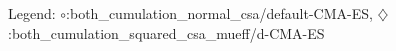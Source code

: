 Legend: {\color{CornflowerBlue}$\circ$}:both\_cumulation\_normal\_csa/default-CMA-ES, {\color{Orange}$\diamondsuit$}:both\_cumulation\_squared\_csa\_mueff/d-CMA-ES